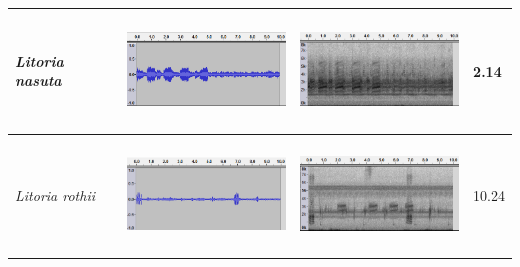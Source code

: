 \begin{table}[htb!]
{\begin{tabular}{llll}
\textit{Litoria nasuta}              &   \begin{minipage}{.3\textwidth} \includegraphics[width=45mm, height=30mm]{image/Ch1/nasuta_jcu_wav.png}  \end{minipage}       &  \begin{minipage}{.3\textwidth} \includegraphics[width=45mm, height=30mm]{image/Ch1/nasuta_jcu_spec.png}  \end{minipage}           & 2.14     \\ \hline
\textit{Litoria rothii}              &   \begin{minipage}{.3\textwidth} \includegraphics[width=45mm, height=30mm]{image/Ch1/rothii_jcu_wav.png}  \end{minipage}       &    \begin{minipage}{.3\textwidth} \includegraphics[width=45mm, height=30mm]{image/Ch1/rothii_jcu_spec.png}  \end{minipage}         & 10.24    \\ \hline

\end{tabular}}
\end{table}
